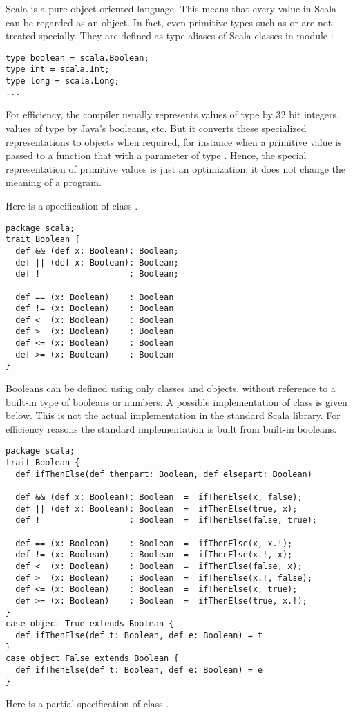 \documentclass[a4paper,12pt,twoside,titlepage]{book}
\begin{document}
Scala is a pure object-oriented language. This means that every value
in Scala can be regarded as an object.  In fact, even primitive types
such as  or  are not treated specially. They
are defined as type aliases of Scala classes in module :
\begin{lstlisting}
type boolean = scala.Boolean;
type int = scala.Int;
type long = scala.Long;
...
\end{lstlisting}
For efficiency, the compiler usually represents values of type
 by 32 bit integers, values of type
 by Java's booleans, etc.  But it converts these
specialized representations to objects when required, for instance
when a primitive  value is passed to a function that with a
parameter of type .  Hence, the special representation of
primitive values is just an optimization, it does not change the
meaning of a program.

Here is a specification of class .
\begin{lstlisting}
package scala;
trait Boolean {
  def && (def x: Boolean): Boolean;
  def || (def x: Boolean): Boolean;
  def !                  : Boolean;

  def == (x: Boolean)    : Boolean
  def != (x: Boolean)    : Boolean
  def <  (x: Boolean)    : Boolean
  def >  (x: Boolean)    : Boolean
  def <= (x: Boolean)    : Boolean
  def >= (x: Boolean)    : Boolean
}
\end{lstlisting}
Booleans can be defined using only classes and objects, without
reference to a built-in type of booleans or numbers. A possible
implementation of class  is given below.  This is not
the actual implementation in the standard Scala library. For
efficiency reasons the standard implementation is built from built-in
booleans.
\begin{lstlisting}
package scala;
trait Boolean {
  def ifThenElse(def thenpart: Boolean, def elsepart: Boolean)

  def && (def x: Boolean): Boolean  =  ifThenElse(x, false);
  def || (def x: Boolean): Boolean  =  ifThenElse(true, x);
  def !                  : Boolean  =  ifThenElse(false, true);

  def == (x: Boolean)    : Boolean  =  ifThenElse(x, x.!);
  def != (x: Boolean)    : Boolean  =  ifThenElse(x.!, x);
  def <  (x: Boolean)    : Boolean  =  ifThenElse(false, x);
  def >  (x: Boolean)    : Boolean  =  ifThenElse(x.!, false);
  def <= (x: Boolean)    : Boolean  =  ifThenElse(x, true);
  def >= (x: Boolean)    : Boolean  =  ifThenElse(true, x.!);
}
case object True extends Boolean {
  def ifThenElse(def t: Boolean, def e: Boolean) = t
}
case object False extends Boolean {
  def ifThenElse(def t: Boolean, def e: Boolean) = e
}
\end{lstlisting}
Here is a partial specification of class .
\end{document}
